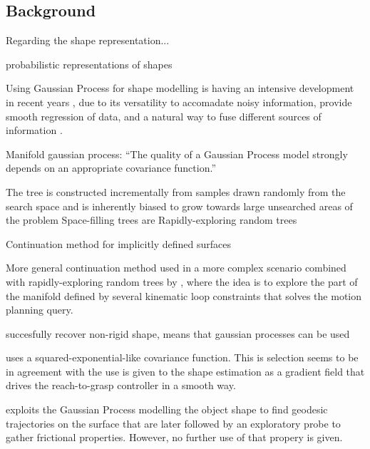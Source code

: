\subsection{Background}
\label{sec:background}


Regarding the shape representation...

\citet{Faria2010Probabilistic} probabilistic representations of shapes

Using Gaussian Process for shape modelling is having an intensive development in recent years \citep{Mahler2015Grasp,Rosales2014Active,Bjorkman2013Enhancing,Dragiev2011Gaussian}, due to its versatility to accomadate noisy information, provide smooth regression of data, and a natural way to fuse different sources of information \citep{Rasmussen2006Gaussian}.

Manifold gaussian process: \citet{Calandra2014Manifold} ``The quality of a Gaussian Process model strongly depends on an appropriate covariance function.''

The tree is constructed incrementally from samples drawn randomly from the search space and is inherently biased to grow towards large unsearched areas of the problem
Space-filling trees are
Rapidly-exploring random trees \citet{LaValle2011Motion}

Continuation method for implicitly defined surfaces \citet{Henderson1993COMPUTING}

More general continuation method used in a more complex scenario combined with rapidly-exploring random trees \citep{LaValle2011Motion} by \citet{Jaillet2013Path}, where the idea is to explore the part of the manifold defined by several kinematic loop constraints that solves the motion planning query.

\citet{Zhu2009Nonrigid} succesfully recover non-rigid shape, means that gaussian processes can be used

\citet{Dragiev2011Gaussian} uses a squared-exponential-like covariance function. This is selection seems to be in agreement with the use is given to the shape estimation as a gradient field that drives the reach-to-grasp controller in a smooth way.

\citet{Rosales2014Active} exploits the Gaussian Process modelling the object shape to find geodesic trajectories on the surface that are later followed by an exploratory probe to gather frictional properties. However, no further use of that propery is given.

